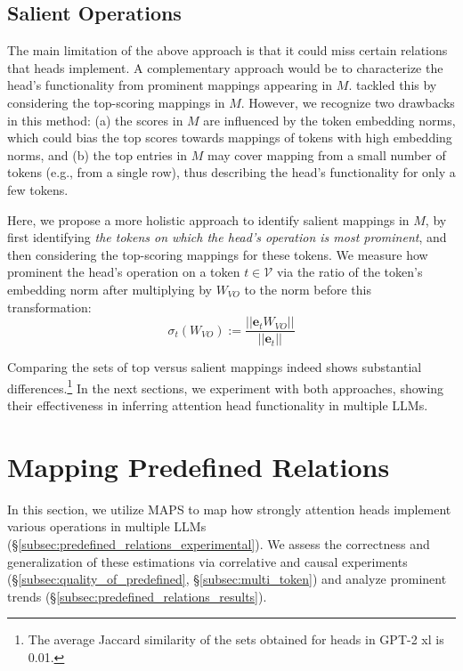 \documentclass[11pt]{article}
\newcommand{\GPTxl}{GPT-2 xl}
\newcommand{\framework}{\textsc{MAPS}}
\begin{document}
\subsection{Salient Operations}
\label{subsec:salient_operations}

The main limitation of the above approach is that it could miss certain relations that heads implement. A complementary approach would be to characterize the head's functionality from prominent mappings appearing in $M$. \citet{Dar2022AnalyzingTI} tackled this by considering the top-scoring mappings in $M$. However, we recognize two drawbacks in this method: (a) the scores in $M$ are influenced by the token embedding norms, which could bias the top scores towards mappings of tokens with high embedding norms, and (b) the top entries in $M$ may cover mapping from a small number of tokens (e.g., from a single row), thus describing the head's functionality for only a few tokens.

Here, we propose a more holistic approach to identify salient mappings in $M$, by first identifying \textit{the tokens on which the head's operation is most prominent}, and then considering the top-scoring mappings for these tokens.
We measure how prominent the head's operation on a token $t \in \mathcal{V}$ via the ratio of the token's embedding norm after multiplying by $W_{VO}$ to the norm before this transformation:
\begin{equation}
\label{eq:saliency_score}
\sigma_t(W_{VO}) :=\frac{||\mathbf{e}_t W_{VO}||}{||\mathbf{e}_t||}
\end{equation}

Comparing the sets of top versus salient mappings indeed shows substantial differences.\footnote{The average Jaccard similarity of the sets obtained for heads in \GPTxl{} is 0.01.} 
In the next sections, we experiment with both approaches, showing their effectiveness in inferring attention head functionality in multiple LLMs.


\section{Mapping Predefined Relations}
\label{sec:predefined_relations}

In this section, we utilize \framework{} to map how strongly attention heads implement various operations in multiple LLMs (\S\ref{subsec:predefined_relations_experimental}).
We assess the correctness and generalization of these estimations via correlative and causal experiments (\S\ref{subsec:quality_of_predefined}, \S\ref{subsec:multi_token}) and 
analyze prominent trends
(\S\ref{subsec:predefined_relations_results}).
\end{document}
